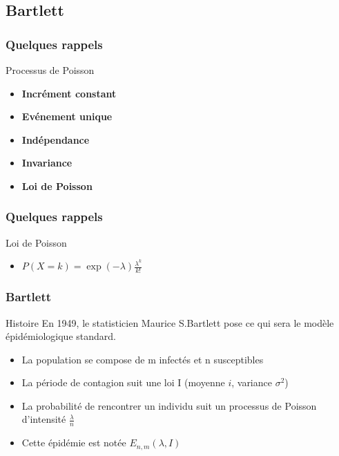 \subsection{Bartlett}

\begin{frame}
    \frametitle{Quelques rappels}
    \begin{block}{Processus de Poisson}
        \begin{itemize}
            \item \textbf{Incrément constant}
            \item \textbf{Evénement unique}
            \item \textbf{Indépendance}
            \item \textbf{Invariance}
            \item \textbf{Loi de Poisson}
        \end{itemize}
    \end{block}
\end{frame}

\begin{frame}
    \frametitle{Quelques rappels}
    \begin{block}{Loi de Poisson}
        \begin{itemize}
            \item $ P(X=k) = \exp(-\lambda)\frac{\lambda^k}{k!} $
        \end{itemize}
    \end{block}
\end{frame}

\begin{frame}
    \frametitle{Bartlett}

    \begin{block}{Histoire}
        En 1949, le statisticien Maurice S.Bartlett pose ce qui sera le modèle épidémiologique standard.
    \end{block}

    \begin{itemize}
        \item La population se compose de m infectés et n susceptibles
        \item La période de contagion suit une loi I (moyenne $i$, variance $\sigma^2$)
        \item La probabilité de rencontrer un individu suit un processus de Poisson d’intensité $\frac{\lambda}{n}$
        \item Cette épidémie est notée $E_{n,m}(\lambda, I)$
    \end{itemize}
\end{frame}

